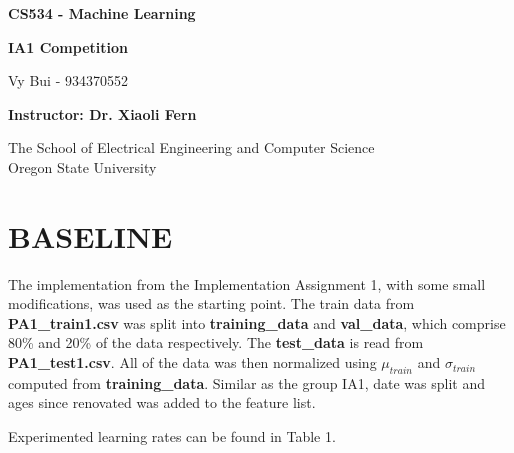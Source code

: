 \documentclass[12pt,article]{article}
\begin{document}
\begin{titlepage}
    \begin{center}
        \vspace*{4cm}

        \textbf{\Large CS534 - Machine Learning}

        \vspace{0.5cm}
 
        \textbf{\Large IA1 Competition}
 
        \vspace{1cm}

        Vy Bui - 934370552

        \vspace{2cm}

        \textbf{Instructor: Dr. Xiaoli Fern}
        \vfill
             
        \vspace{0.8cm}
      
             
        The School of Electrical Engineering and Computer Science\\
        Oregon State University\\
             
    \end{center}
\end{titlepage}

\section*{BASELINE}
The implementation from the Implementation Assignment 1, with some small 
modifications, was used as the starting point. The train data from 
\textbf{PA1\_train1.csv} was split into \textbf{training\_data} and 
\textbf{val\_data}, which comprise 80\% and 20\% of the data respectively. The 
\textbf{test\_data} is read from \textbf{PA1\_test1.csv}. All of the data was 
then normalized using $\mu_{train}$ and $\sigma_{train}$ computed from 
\textbf{training\_data}. Similar as the group IA1, date was split and ages since 
renovated was added to the feature list.

Experimented learning rates can be found in Table 1.
\end{document}
